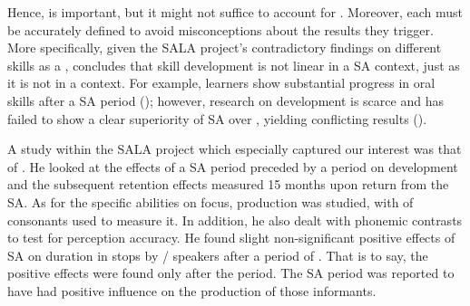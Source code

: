 \documentclass[output=paper]{langsci/langscibook}
\begin{document}
  Hence,  is important, but it might not suffice to account for  . Moreover, each  must be accurately defined to avoid misconceptions about the  results they trigger. More specifically, given the SALA project’s contradictory findings on different  skills as a , \citet[29-30]{Pérez-Vidal2014} concludes that skill development is not linear in a SA context, just as it is not in a  context. For example, learners show substantial progress in oral skills after a SA period (\citealt{López-Serrano2010}); however, research on   development is scarce and has failed to show a clear superiority of SA over , yielding conflicting results (\citealt{Díaz-Campos2004,Avello2010a,SanzEtAl2013}).



  A study within the SALA project which especially captured our interest was that of \citet{Mora2008}. He looked at the effects of a SA period preceded by a  period on   development and the subsequent retention effects measured 15 months upon return from the SA. As for the specific abilities on focus,  production was studied, with  of    consonants used to measure it. In addition, he also dealt with phonemic contrasts to test for perception accuracy. He found slight non-significant positive effects of SA on  duration in  stops by / speakers after a period of . That is to say, the positive effects were found only after the  period. The SA period was reported to have had positive influence on the  production of those informants. 
\end{document}
